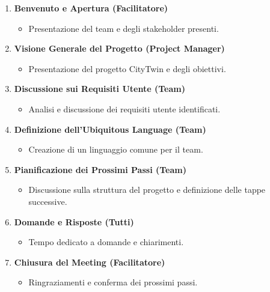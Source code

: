 \begin{enumerate}
    \item \textbf{Benvenuto e Apertura (Facilitatore)}
    \begin{itemize}
        \item Presentazione del team e degli stakeholder presenti.
    \end{itemize}
    
    \item \textbf{Visione Generale del Progetto (Project Manager)}
    \begin{itemize}
        \item Presentazione del progetto CityTwin e degli obiettivi.
    \end{itemize}
    
    \item \textbf{Discussione sui Requisiti Utente (Team)}
    \begin{itemize}
        \item Analisi e discussione dei requisiti utente identificati.
    \end{itemize}
    
    \item \textbf{Definizione dell'Ubiquitous Language (Team)}
    \begin{itemize}
        \item Creazione di un linguaggio comune per il team.
    \end{itemize}
    
    \item \textbf{Pianificazione dei Prossimi Passi (Team)}
    \begin{itemize}
        \item Discussione sulla struttura del progetto e definizione delle tappe successive.
    \end{itemize}
    
    \item \textbf{Domande e Risposte (Tutti)}
    \begin{itemize}
        \item Tempo dedicato a domande e chiarimenti.
    \end{itemize}
    
    \item \textbf{Chiusura del Meeting (Facilitatore)}
    \begin{itemize}
        \item Ringraziamenti e conferma dei prossimi passi.
    \end{itemize}
\end{enumerate}

